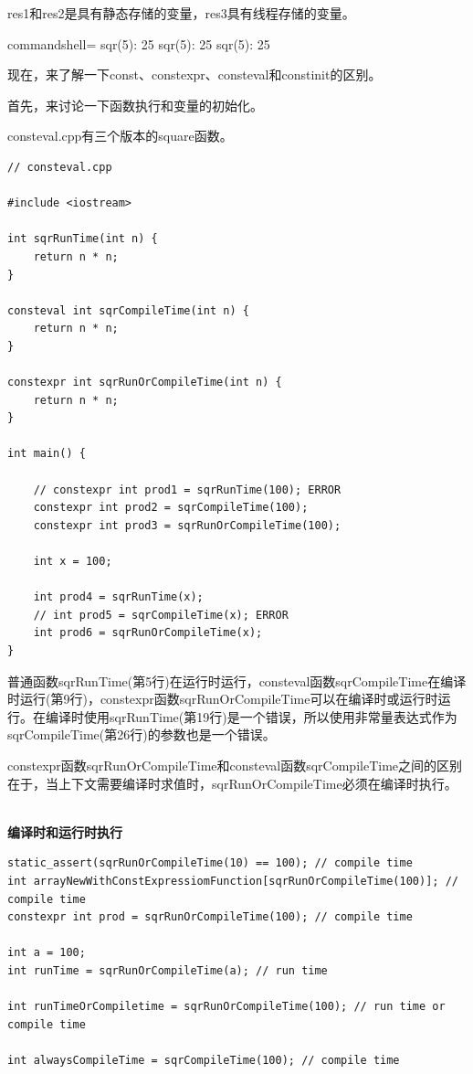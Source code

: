 res1和res2是具有静态存储的变量，res3具有线程存储的变量。

\begin{tcblisting}{commandshell={}}
sqr(5): 25
sqr(5): 25
sqr(5): 25
\end{tcblisting}

现在，来了解一下const、constexpr、consteval和constinit的区别。

首先，来讨论一下函数执行和变量的初始化。


consteval.cpp有三个版本的square函数。

\begin{lstlisting}[style=styleCXX]
// consteval.cpp

#include <iostream>

int sqrRunTime(int n) {
	return n * n;
}

consteval int sqrCompileTime(int n) {
	return n * n;
}

constexpr int sqrRunOrCompileTime(int n) {
	return n * n;
}

int main() {

	// constexpr int prod1 = sqrRunTime(100); ERROR
	constexpr int prod2 = sqrCompileTime(100);
	constexpr int prod3 = sqrRunOrCompileTime(100);

	int x = 100;
	
	int prod4 = sqrRunTime(x);
	// int prod5 = sqrCompileTime(x); ERROR
	int prod6 = sqrRunOrCompileTime(x);
}
\end{lstlisting}

普通函数sqrRunTime(第5行)在运行时运行，consteval函数sqrCompileTime在编译时运行(第9行)，constexpr函数sqrRunOrCompileTime可以在编译时或运行时运行。在编译时使用sqrRunTime(第19行)是一个错误，所以使用非常量表达式作为sqrCompileTime(第26行)的参数也是一个错误。

constexpr函数sqrRunOrCompileTime和consteval函数sqrCompileTime之间的区别在于，当上下文需要编译时求值时，sqrRunOrCompileTime必须在编译时执行。

\hspace*{\fill} \\ %
\noindent
\textbf{编译时和运行时执行}
\begin{lstlisting}[style=styleCXX]
static_assert(sqrRunOrCompileTime(10) == 100); // compile time
int arrayNewWithConstExpressiomFunction[sqrRunOrCompileTime(100)]; // compile time
constexpr int prod = sqrRunOrCompileTime(100); // compile time

int a = 100;
int runTime = sqrRunOrCompileTime(a); // run time

int runTimeOrCompiletime = sqrRunOrCompileTime(100); // run time or compile time

int alwaysCompileTime = sqrCompileTime(100); // compile time
\end{lstlisting}

